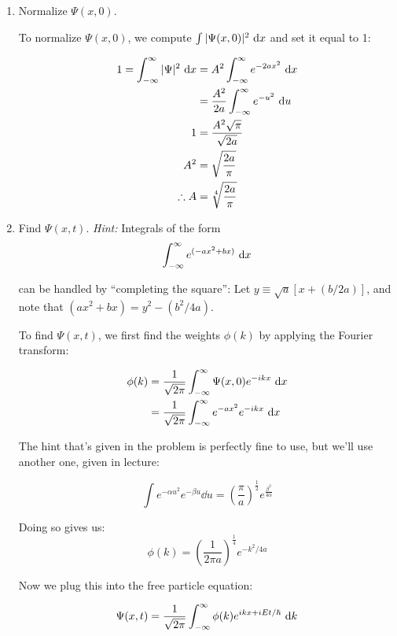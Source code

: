 \documentclass{article}
\begin{document}
\begin{enumerate}[label=(\alph*)]
    \item Normalize $\Psi(x, 0)$.
    
    \begin{solution}
        To normalize $\Psi(x, 0)$, we compute $\int |\Psi(x, 0)|^2 \ \mathrm d x$ and set it equal to 1:

        \begin{align*}
            1 = \int_{-\infty}^{\infty} |\Psi|^2 \ \mathrm d x &= A^2 \int_{-\infty}^{\infty} e^{-2ax^2} \ \mathrm d x\\
            &= \frac{A^2}{2a} \int_{-\infty}^{\infty} e^{-u^2} \ \mathrm d u\\
            1 &= \frac{A^2\sqrt{\pi}}{\sqrt{2a}}\\
            A^2 &= \sqrt{\frac{2a}{\pi}}\\
            \therefore A &= \sqrt[4]{\frac{2a}{\pi}} 
        \end{align*}
    \end{solution}
    \item Find $\Psi(x, t)$. \textit{Hint:} Integrals of the form 
    \[ \int_{-\infty}^{\infty} e^{(-ax^2 + bx)} \ \mathrm d x\] 

    can be handled by ``completing the square'': Let $y \equiv \sqrt{a}[x + (b/2a)]$, and note that $(ax^2 + bx) = y^2 - (b^2/4a)$. 

    \begin{solution}
        To find $\Psi(x, t)$, we first find the weights $\phi(k)$ by applying the Fourier transform: 

        \begin{align*}
            \phi(k) &= \frac{1}{\sqrt{2\pi}} \int_{-\infty}^{\infty} \Psi(x, 0)e^{-ikx} \ \mathrm d x\\
            &= \frac{1}{\sqrt{2\pi}} \int_{-\infty}^{\infty} e^{-ax^2}e^{-ikx} \ \mathrm d x 
        \end{align*}

        The hint that's given in the problem is perfectly fine to use, but we'll use another one, given in lecture:

        \[ \int e^{-\alpha u^2}e^{-\beta u} \dd u = \left(\frac{\pi}{a}\right)^{\frac{1}{2}}e^{\frac{\beta^2}{4\alpha}}\]

        Doing so gives us:
        \[ \phi(k) = \left(\frac{1}{2\pi a}\right)^{\frac{1}{4}}e^{-k^2/4a}\]

        Now we plug this into the free particle equation:

        \[ \Psi(x, t) = \frac{1}{\sqrt{2\pi}} \int_{-\infty}^{\infty} \phi(k) e^{ikx + iEt/\hbar} \ \mathrm d k\]


\end{solution}
\end{enumerate}
\end{document}
